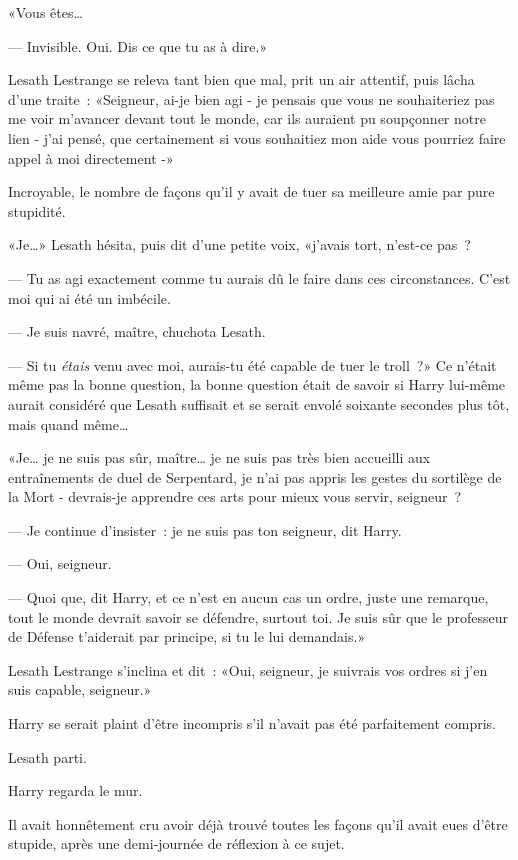 «Vous êtes…

--- Invisible. Oui. Dis ce que tu as à dire.»

Lesath Lestrange se releva tant bien que mal, prit un air attentif, puis lâcha d'une traite~: «Seigneur, ai-je bien agi - je pensais que vous ne souhaiteriez pas me voir m'avancer devant tout le monde, car ils auraient pu soupçonner notre lien - j'ai pensé, que certainement si vous souhaitiez mon aide vous pourriez faire appel à moi directement -»

Incroyable, le nombre de façons qu'il y avait de tuer sa meilleure amie par pure stupidité.

«Je…» Lesath hésita, puis dit d'une petite voix, «j'avais tort, n'est-ce pas~?

--- Tu as agi exactement comme tu aurais dû le faire dans ces circonstances. C'est moi qui ai été un imbécile.

--- Je suis navré, maître, chuchota Lesath.

--- Si tu \emph{étais} venu avec moi, aurais-tu été capable de tuer le troll~?» Ce n'était même pas la bonne question, la bonne question était de savoir si Harry lui-même aurait considéré que Lesath suffisait et se serait envolé soixante secondes plus tôt, mais quand même…

«Je… je ne suis pas sûr, maître… je ne suis pas très bien accueilli aux entraînements de duel de Serpentard, je n'ai pas appris les gestes du sortilège de la Mort - devrais-je apprendre ces arts pour mieux vous servir, seigneur~?

--- Je continue d'insister~: je ne suis pas ton seigneur, dit Harry.

--- Oui, seigneur.

--- Quoi que, dit Harry, et ce n'est en aucun cas un ordre, juste une remarque, tout le monde devrait savoir se défendre, surtout toi. Je suis sûr que le professeur de Défense t'aiderait par principe, si tu le lui demandais.»

Lesath Lestrange s'inclina et dit~: «Oui, seigneur, je suivrais vos ordres si j'en suis capable, seigneur.»

Harry se serait plaint d'être incompris s'il n'avait pas été parfaitement compris.

Lesath parti.

Harry regarda le mur.

Il avait honnêtement cru avoir déjà trouvé toutes les façons qu'il avait eues d'être stupide, après une demi-journée de réflexion à ce sujet.

